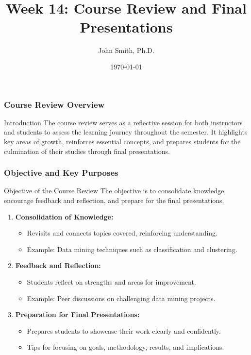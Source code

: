 \documentclass[aspectratio=169]{beamer}
\title[Week 14: Course Review]{Week 14: Course Review and Final Presentations}
\author[J. Smith]{John Smith, Ph.D.}
\institute[University Name]{
  Department of Computer Science\\
  University Name\\
  \vspace{0.3cm}
  Email: email@university.edu\\
  Website: www.university.edu
}
\date{\today}
\begin{document}
\frame{\titlepage}

\begin{frame}[fragile]
    \frametitle{Course Review Overview}
    \begin{block}{Introduction}
        The course review serves as a reflective session for both instructors and students to assess the learning journey throughout the semester. 
        It highlights key areas of growth, reinforces essential concepts, and prepares students for the culmination of their studies through final presentations.
    \end{block}
\end{frame}

\begin{frame}[fragile]
    \frametitle{Objective and Key Purposes}
    \begin{block}{Objective of the Course Review}
        The objective is to consolidate knowledge, encourage feedback and reflection, and prepare for the final presentations.
    \end{block}

    \begin{enumerate}
        \item \textbf{Consolidation of Knowledge:}
        \begin{itemize}
            \item Revisits and connects topics covered, reinforcing understanding.
            \item Example: Data mining techniques such as classification and clustering.
        \end{itemize}
        
        \item \textbf{Feedback and Reflection:}
        \begin{itemize}
            \item Students reflect on strengths and areas for improvement.
            \item Example: Peer discussions on challenging data mining projects.
        \end{itemize}
        
        \item \textbf{Preparation for Final Presentations:}
        \begin{itemize}
            \item Prepares students to showcase their work clearly and confidently.
            \item Tips for focusing on goals, methodology, results, and implications.
        \end{itemize}
    \end{enumerate}
\end{frame}
\end{document}
